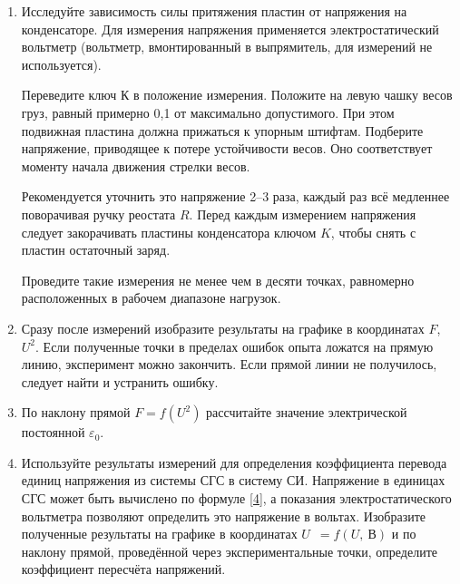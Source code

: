 \begin{lab:task}
\begin{enumerate}
		\item Исследуйте зависимость силы притяжения пластин от напряжения на конденсаторе. Для измерения напряжения применяется
		электростатический вольтметр (вольтметр, вмонтированный в выпрямитель, для измерений не используется).
		
		Переведите ключ К в положение измерения. Положите на левую чашку весов груз, равный примерно 0,1 от максимально
		допустимого. При этом подвижная пластина должна прижаться к упорным штифтам. Подберите напряжение, приводящее к потере
		устойчивости весов. Оно соответствует моменту начала движения стрелки весов.
		
		Рекомендуется уточнить это напряжение 2--3 раза, каждый раз всё медленнее поворачивая ручку реостата $R$. Перед каждым
		измерением напряжения следует закорачивать пластины конденсатора ключом $K$, чтобы снять с пластин остаточный заряд.
		
		Проведите такие измерения не менее чем в десяти точках, равномерно расположенных в рабочем диапазоне нагрузок.
		
		\item Сразу после измерений изобразите результаты на графике в координатах $F$, $U^2$. Если полученные точки в пределах
		ошибок опыта ложатся на прямую линию, эксперимент можно закончить. Если прямой линии не получилось, следует найти и
		устранить ошибку.
		
		\item По наклону прямой $F=f(U^2)$  рассчитайте значение электрической постоянной $\varepsilon_0$.
		
		\item Используйте результаты измерений для определения коэффициента перевода единиц напряжения из системы СГС в систему СИ.
		Напряжение в единицах СГС может быть вычислено по формуле \eqref{4}, а показания электростатического вольтметра позволяют
		определить это напряжение в вольтах. Изобразите полученные результаты на графике в координатах $U$~$=f(U,~\text{В})$ и по
		наклону прямой, проведённой через экспериментальные точки, определите коэффициент пересчёта напряжений.

	\end{enumerate}

\end{lab:task}

